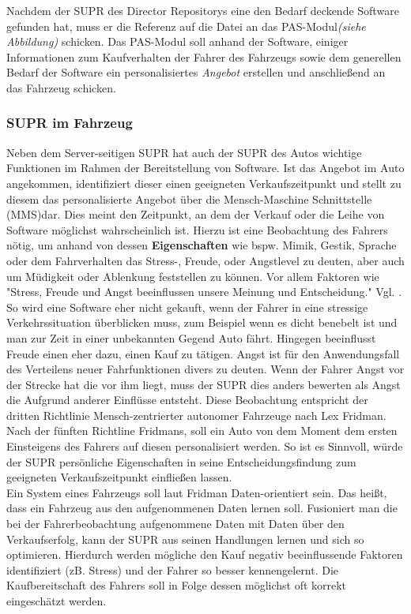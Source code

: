 Nachdem der SUPR des Director Repositorys eine den Bedarf deckende Software gefunden hat, muss er die Referenz auf die Datei an das PAS-Modul\textit{(siehe Abbildung)} schicken. Das PAS-Modul soll anhand der Software, einiger Informationen zum Kaufverhalten der Fahrer des Fahrzeugs sowie dem generellen Bedarf der Software ein personalisiertes \textit{Angebot} erstellen und anschließend an das Fahrzeug schicken.

\subsubsection{SUPR im Fahrzeug} 
Neben dem Server-seitigen SUPR hat auch der SUPR des Autos wichtige Funktionen im Rahmen der Bereitstellung von Software. 
Ist das Angebot im Auto angekommen, identifiziert dieser einen geeigneten Verkaufszeitpunkt und stellt zu diesem das personalisierte Angebot über die Mensch-Maschine Schnittstelle (MMS)dar. Dies meint den Zeitpunkt, an dem der Verkauf oder die Leihe von Software möglichst wahrscheinlich ist. Hierzu ist eine Beobachtung des Fahrers nötig, um anhand von dessen \textbf{Eigenschaften} wie bspw. Mimik, Gestik, Sprache oder dem Fahrverhalten das Stress-, Freude, oder Angstlevel zu deuten, aber auch um Müdigkeit oder Ablenkung feststellen zu können. Vor allem Faktoren wie "Stress, Freude und Angst beeinflussen unsere Meinung und Entscheidung." Vgl. \cite[S.44]{Spindler2016}.
So wird eine Software eher nicht gekauft, wenn der Fahrer in eine stressige Verkehrssituation überblicken muss, zum Beispiel wenn es dicht benebelt ist und man zur Zeit in einer unbekannten Gegend Auto fährt. Hingegen beeinflusst Freude einen eher dazu, einen Kauf zu tätigen. Angst ist für den Anwendungsfall des Verteilens neuer Fahrfunktionen divers zu deuten. Wenn der Fahrer Angst vor der Strecke hat die vor ihm liegt, muss der SUPR dies anders bewerten als Angst die Aufgrund anderer Einflüsse entsteht. Diese Beobachtung entspricht der dritten Richtlinie Mensch-zentrierter autonomer Fahrzeuge nach Lex Fridman. \cite[S. 3]{b5} Nach der fünften Richtline Fridmans, soll ein Auto von dem Moment dem ersten Einsteigens des Fahrers auf diesen personalisiert werden.\cite[S. 5]{b5} So ist es Sinnvoll, würde der SUPR persönliche Eigenschaften in seine Entscheidungsfindung zum geeigneten Verkaufszeitpunkt einfließen lassen. \\

Ein System eines Fahrzeugs soll laut Fridman Daten-orientiert sein\cite[S. 3]{b5}. Das heißt, dass ein Fahrzeug aus den aufgenommenen Daten lernen soll. Fusioniert man die bei der Fahrerbeobachtung aufgenommene Daten mit Daten über den Verkaufserfolg, kann der SUPR aus seinen Handlungen lernen und sich so optimieren. Hierdurch werden mögliche den Kauf negativ beeinflussende Faktoren identifiziert (zB. Stress) und der Fahrer so besser kennengelernt. Die Kaufbereitschaft des Fahrers soll in Folge dessen möglichst oft korrekt eingeschätzt werden.\\

